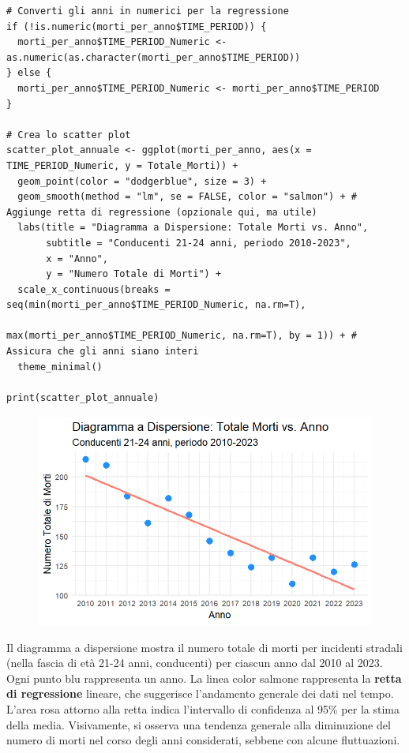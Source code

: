 \documentclass[14pt, openany, titlepage]{report} %
\begin{document}
\begin{center}
\begin{lstlisting}[breaklines=true]
# Converti gli anni in numerici per la regressione
if (!is.numeric(morti_per_anno$TIME_PERIOD)) {
  morti_per_anno$TIME_PERIOD_Numeric <- as.numeric(as.character(morti_per_anno$TIME_PERIOD))
} else {
  morti_per_anno$TIME_PERIOD_Numeric <- morti_per_anno$TIME_PERIOD
}

# Crea lo scatter plot
scatter_plot_annuale <- ggplot(morti_per_anno, aes(x = TIME_PERIOD_Numeric, y = Totale_Morti)) +
  geom_point(color = "dodgerblue", size = 3) +
  geom_smooth(method = "lm", se = FALSE, color = "salmon") + # Aggiunge retta di regressione (opzionale qui, ma utile)
  labs(title = "Diagramma a Dispersione: Totale Morti vs. Anno",
       subtitle = "Conducenti 21-24 anni, periodo 2010-2023",
       x = "Anno",
       y = "Numero Totale di Morti") +
  scale_x_continuous(breaks = seq(min(morti_per_anno$TIME_PERIOD_Numeric, na.rm=T),
                                  max(morti_per_anno$TIME_PERIOD_Numeric, na.rm=T), by = 1)) + # Assicura che gli anni siano interi
  theme_minimal()

print(scatter_plot_annuale)
\end{lstlisting}
\end{center}

\begin{figure}[H]
    \centering
    \includegraphics[width=12cm, height=7cm]{Rplot010.png}
\end{figure}

\noindent
Il diagramma a dispersione mostra il numero totale di morti per 
incidenti stradali (nella fascia di età 21-24 anni, conducenti)
per ciascun anno dal 2010 al 2023. Ogni punto blu rappresenta 
un anno. La linea color salmone rappresenta la \textbf{retta di regressione}
lineare, che suggerisce l'andamento generale dei dati nel tempo.
L'area rosa attorno alla retta indica l'intervallo di confidenza 
al 95\% per la stima della media. Visivamente, si osserva una 
tendenza generale alla diminuzione del numero di morti nel corso 
degli anni considerati, sebbene con alcune fluttuazioni.
\end{document}
